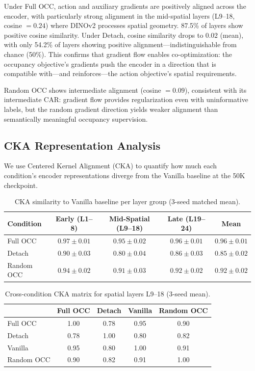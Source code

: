 \documentclass[letterpaper]{article}
\begin{document}
Under Full OCC, action and auxiliary gradients are positively aligned across the encoder, with particularly strong alignment in the mid-spatial layers (L9--18, cosine $= 0.24$) where DINOv2 processes spatial geometry. 87.5\% of layers show positive cosine similarity. Under Detach, cosine similarity drops to $0.02$ (mean), with only 54.2\% of layers showing positive alignment---indistinguishable from chance (50\%). This confirms that gradient flow enables co-optimization: the occupancy objective's gradients push the encoder in a direction that is compatible with---and reinforces---the action objective's spatial requirements.

Random OCC shows intermediate alignment (cosine $= 0.09$), consistent with its intermediate CAR: gradient flow provides regularization even with uninformative labels, but the random gradient direction yields weaker alignment than semantically meaningful occupancy supervision.

\subsection{CKA Representation Analysis}
\label{sec:exp-cka}

We use Centered Kernel Alignment (CKA) to quantify how much each condition's encoder representations diverge from the Vanilla baseline at the 50K checkpoint.

\begin{table}[h]
\centering
\caption{CKA similarity to Vanilla baseline per layer group (3-seed matched mean).}
\label{tab:cka}
\begin{tabular}{lcccc}
\toprule
Condition & Early (L1--8) & Mid-Spatial (L9--18) & Late (L19--24) & Mean \\
\midrule
Full OCC   & $0.97 \pm 0.01$ & $\mathbf{0.95} \pm 0.02$ & $0.96 \pm 0.01$ & $0.96 \pm 0.01$ \\
Detach     & $0.90 \pm 0.03$ & $0.80 \pm 0.04$          & $0.86 \pm 0.03$ & $0.85 \pm 0.02$ \\
Random OCC & $0.94 \pm 0.02$ & $0.91 \pm 0.03$          & $0.92 \pm 0.02$ & $0.92 \pm 0.02$ \\
\bottomrule
\end{tabular}
\end{table}

\begin{table}[h]
\centering
\caption{Cross-condition CKA matrix for spatial layers L9--18 (3-seed mean).}
\label{tab:cka-cross}
\begin{tabular}{lcccc}
\toprule
 & Full OCC & Detach & Vanilla & Random OCC \\
\midrule
Full OCC   & 1.00 & 0.78 & 0.95 & 0.90 \\
Detach     & 0.78 & 1.00 & 0.80 & 0.82 \\
Vanilla    & 0.95 & 0.80 & 1.00 & 0.91 \\
Random OCC & 0.90 & 0.82 & 0.91 & 1.00 \\
\bottomrule
\end{tabular}
\end{table}
\end{document}
